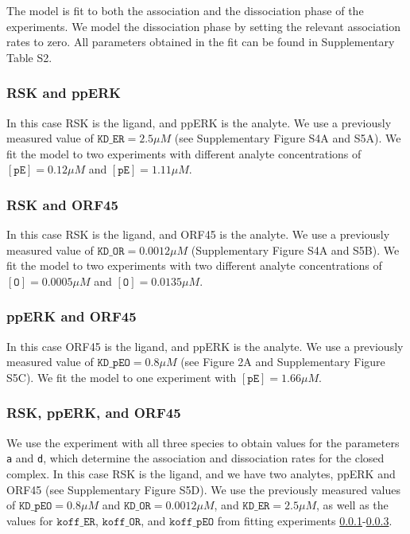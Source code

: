 \documentclass[12pt]{article}
\begin{document}
	The model is fit to both the association and the dissociation phase
	of the experiments. We model the dissociation phase by setting the
	relevant association rates to zero. All parameters obtained in the fit can be found in Supplementary Table S2.
	
	\subsubsection{RSK and ppERK}
	\label{sss:er} In this case RSK is the ligand, and ppERK is the analyte.
	We use a previously measured value of $\texttt{KD\_ER}=2.5\mu M$ (see Supplementary Figure S4A and S5A). We fit the model to two experiments with different analyte concentrations of $[\texttt{pE}]=0.12\mu M$ and
	$[\texttt{pE}]=1.11\mu M$.
	
	
	\subsubsection{RSK and ORF45}
	In this case RSK is the ligand, and ORF45 is the analyte. We use a
	previously measured value of $\texttt{KD\_OR}=0.0012\mu M$ (Supplementary Figure S4A and S5B). We fit the model to two experiments with two different analyte concentrations of $[\texttt{O}]=0.0005\mu M$ and $[\texttt{O}]=0.0135\mu M$.
	
	
	\subsubsection{ppERK and ORF45}
	
	\label{sss:eo} In this case ORF45 is the ligand, and ppERK is the
	analyte. We use a previously measured value of $\texttt{KD\_pEO}=0.8\mu M$
	(see Figure 2A and Supplementary Figure S5C). We fit the model to one experiment with $[\texttt{pE}]=1.66\mu M$.
	
	
	\subsubsection{RSK, ppERK, and ORF45}
	
	We use the experiment with all three species to obtain values for
	the parameters \texttt{a} and \texttt{d}, which determine the association
	and dissociation rates for the closed complex. In this case RSK is
	the ligand, and we have two analytes, ppERK and ORF45 (see Supplementary Figure S5D). We use the previously measured values of $\texttt{KD\_pEO}=0.8\mu M$ and $\texttt{KD\_OR}=0.0012\mu M$, and $\texttt{KD\_ER}=2.5\mu M$, as well as the values for $\texttt{koff\_ER}$, $\texttt{koff\_OR}$, and $\texttt{koff\_pEO}$ from fitting experiments \ref{sss:er}-\ref{sss:eo}.
	
\end{document}
